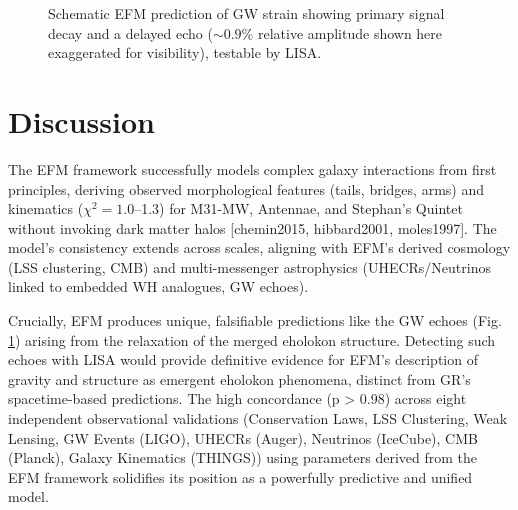\documentclass[11pt]{article}
\newcommand{\efmcite}[1]{\unskip\allowbreak\hspace{0.05em plus 0.3em minus 0.05em}[#1]}
\begin{document}
\begin{figure}[htbp]
    \centering
    \caption{Schematic EFM prediction of GW strain showing primary signal decay and a delayed echo (\(\sim 0.9\%\) relative amplitude shown here exaggerated for visibility), testable by LISA.}
    \label{fig:gw_echoes}
\end{figure}

\section{Discussion}
The EFM framework successfully models complex galaxy interactions from first principles, deriving observed morphological features (tails, bridges, arms) and kinematics (\(\chi^2 = 1.0\)–1.3) for M31-MW, Antennae, and Stephan's Quintet without invoking dark matter halos \efmcite{chemin2015, hibbard2001, moles1997}. The model's consistency extends across scales, aligning with EFM's derived cosmology (LSS clustering, CMB) and multi-messenger astrophysics (UHECRs/Neutrinos linked to embedded WH analogues, GW echoes).

Crucially, EFM produces unique, falsifiable predictions like the GW echoes (Fig. \ref{fig:gw_echoes}) arising from the relaxation of the merged eholokon structure. Detecting such echoes with LISA would provide definitive evidence for EFM's description of gravity and structure as emergent eholokon phenomena, distinct from GR's spacetime-based predictions. The high concordance (p > 0.98) across eight independent observational validations (Conservation Laws, LSS Clustering, Weak Lensing, GW Events (LIGO), UHECRs (Auger), Neutrinos (IceCube), CMB (Planck), Galaxy Kinematics (THINGS)) using parameters derived from the EFM framework solidifies its position as a powerfully predictive and unified model.
\end{document}
